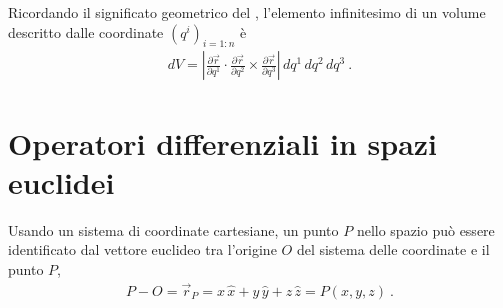 \documentclass[letterpaper,10pt,italian]{jupyterBook}
\begin{document}
\sphinxAtStartPar
Ricordando il significato geometrico del {\hyperref[\detokenize{ch/algebra/vector-algebra-euclidean-space:math-hs-algebra-vector-euclidean-space-mixed-product}]{}}, l’elemento infinitesimo di un volume descritto dalle coordinate \(\left( q^i \right)_{i=1:n}\) è
\begin{equation*}
\begin{split}dV = \left| \frac{\partial \vec{r}}{\partial q^1} \cdot \frac{\partial \vec{r}}{\partial q^2} \times \frac{\partial \vec{r}}{\partial q^3} \right| \, d q^1 \, d q^2 \, d q^3 \ .\end{split}
\end{equation*}
\sphinxstepscope


\section{Operatori differenziali in spazi euclidei}
\label{\detokenize{ch/vector-calculus/derivatives:operatori-differenziali-in-spazi-euclidei}}\label{\detokenize{ch/vector-calculus/derivatives:vector-calculus-derivatives}}\label{\detokenize{ch/vector-calculus/derivatives::doc}}
\sphinxAtStartPar
Usando un sistema di coordinate cartesiane, un punto \(P\) nello spazio può essere identificato dal vettore euclideo tra l’origine \(O\) del sistema delle coordinate e il punto \(P\),
\begin{equation*}
\begin{split}P - O = \vec{r}_P = x \, \hat{x} + y \, \hat{y} + z \, \hat{z}  = P(x,y,z) \ .\end{split}
\end{equation*}
\end{document}
